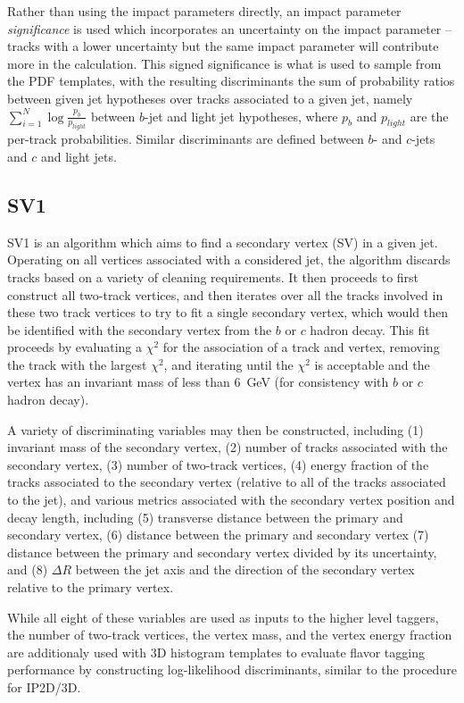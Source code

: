 Rather than using the impact parameters directly, an impact parameter \emph{significance} is used which 
incorporates an uncertainty on the impact parameter -- tracks with a lower uncertainty but the same impact 
parameter will contribute more in the calculation. This signed significance is what is used to sample from the 
PDF templates, with the resulting discriminants the sum of probability ratios between given jet hypotheses over 
tracks associated to a given jet, namely $\sum_{i=1}^{N} \log{\frac{p_{b}}{p_{light}}}$ between $b$-jet and 
light jet hypotheses, where $p_{b}$ and $p_{light}$ are the per-track probabilities. Similar discriminants 
are defined between $b$- and $c$-jets and $c$ and light jets. 

\subsection{SV1}
SV1 is an algorithm which aims to find a secondary vertex (SV) in a given jet. Operating on all 
vertices associated with a considered jet, the algorithm discards tracks based on a variety of cleaning 
requirements. It then proceeds to first construct all two-track vertices, and then iterates over all the 
tracks involved in these two track vertices to try to fit a single secondary vertex, which would then be 
identified with the secondary vertex from the $b$ or $c$ hadron decay. This fit proceeds by evaluating 
a $\chi^2$ for the association of a track and vertex, removing the track with the largest $\chi^2$, 
and iterating until the $\chi^2$ is acceptable and the vertex has an invariant mass of less than 
\SI{6}{\GeV} (for consistency with $b$ or $c$ hadron decay).

A variety of discriminating variables may then be constructed, including (1) invariant mass of the secondary 
vertex, (2) number of tracks associated with the secondary vertex, (3) number of two-track vertices, 
(4) energy fraction of the tracks associated to the secondary vertex (relative to all of the tracks 
associated to the jet), and various metrics associated with the secondary vertex position and decay length, 
including (5) transverse distance between the primary and secondary vertex, (6) distance between the primary 
and secondary vertex (7) distance between the primary and secondary vertex divided by its uncertainty, 
and (8) $\Delta R$ between the jet axis and the direction of the secondary vertex relative to the primary
vertex.

While all eight of these variables are used as inputs to the higher level taggers, the number of two-track vertices, 
the vertex mass, and the vertex energy fraction are additionaly used with 3D histogram templates to evaluate 
flavor tagging performance by constructing log-likelihood discriminants, similar to the procedure for 
IP2D/3D.

